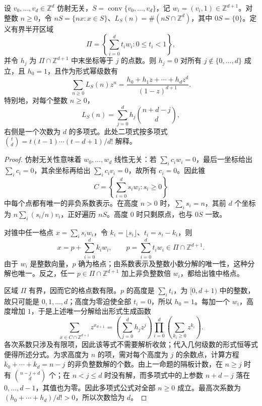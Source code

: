 \begin{proposition}
	\label{g1:prop:lattice-simplex-ehrhart}
	设 \(v_0,\ldots,v_d\in\mathbb Z^d\) 仿射无关，\(S=\operatorname{conv}\{v_0,\ldots,v_d\}\)，记 \(w_i=(v_i,1)\in\mathbb Z^{d+1}\)。对整数 \(n\ge0\)，令 \(nS=\{nx:x\in S\}\)、\(L_S(n)=\#(nS\cap\mathbb Z^d)\)，其中 \(0S=\{0\}\)。定义有界半开区域
	\[
		\Pi=\left\{\sum_{i=0}^d t_iw_i:0\le t_i<1\right\},
	\]
	并令 \(h_j\) 为 \(\Pi\cap\mathbb Z^{d+1}\) 中末坐标等于 \(j\) 的点数。则 \(h_j=0\) 对所有 \(j\notin\{0,\ldots,d\}\) 成立，且 \(h_0=1\)，且作为形式幂级数有
	\[
		\sum_{n\ge0}L_S(n)z^n
		=\frac{h_0+h_1z+\cdots+h_dz^d}{(1-z)^{d+1}}.
	\]
	特别地，对每个整数 \(n\ge0\)，
	\[
		L_S(n)=\sum_{j=0}^d h_j\binom{n+d-j}{d},
	\]
	右侧是一个次数为 \(d\) 的多项式。此处二项式按多项式 \(\binom{t}{d}=t(t-1)\cdots(t-d+1)/d!\) 解释。
\end{proposition}
\begin{proof}
	仿射无关性意味着 \(w_0,\ldots,w_d\) 线性无关：若 \(\sum_i c_iw_i=0\)，最后一坐标给出 \(\sum_i c_i=0\)，其余坐标再给出 \(\sum_i c_iv_i=0\)，故所有 \(c_i=0\)。因此锥
	\[
		C=\left\{\sum_{i=0}^d s_iw_i:s_i\ge0\right\}
	\]
	中每个点都有唯一的非负系数表示。在高度 \(n>0\) 时，\(\sum_i s_i=n\)，其前 \(d\) 个坐标为 \(n\sum_i(s_i/n)v_i\)，正好遍历 \(nS\)。高度 \(0\) 时只剩原点，也与 \(0S\) 一致。

	对锥中任一格点 \(x=\sum_i s_iw_i\)，令 \(k_i=\lfloor s_i\rfloor\)、\(t_i=s_i-k_i\)，则
	\[
		x=p+\sum_{i=0}^d k_iw_i,
		\qquad p=\sum_{i=0}^d t_iw_i\in\Pi\cap\mathbb Z^{d+1}.
	\]
	由于 \(w_i\) 是整数向量，\(p\) 确为格点；由系数表示及整数小数分解的唯一性，这种分解也唯一。反之，任一 \(p\in\Pi\cap\mathbb Z^{d+1}\) 加上非负整数倍 \(w_i\)，都给出锥中格点。

	区域 \(\Pi\) 有界，因而它的格点数有限。\(p\) 的高度是 \(\sum_i t_i\)，为 \([0,d+1)\) 中的整数，故只可能是 \(0,1,\ldots,d\)；高度为零迫使全部 \(t_i=0\)，所以 \(h_0=1\)。每加一个 \(w_i\)，高度增加 \(1\)，于是上述唯一分解给出形式生成函数
	\[
		\sum_{x\in C\cap\mathbb Z^{d+1}}z^{x_{d+1}}
		=\left(\sum_{j=0}^d h_jz^j\right)
		\prod_{i=0}^d\left(\sum_{k_i\ge0}z^{k_i}\right).
	\]
	各次系数只涉及有限项，因此该等式不需要解析收敛；代入几何级数的形式恒等式便得所述分式。为求高度为 \(n\) 的项，需对每个高度为 \(j\) 的余数点，计算方程 \(k_0+\cdots+k_d=n-j\) 的非负整数解的个数。由上一命题的隔板计数，在 \(n\ge j\) 时有 \(\binom{n-j+d}{d}\) 个；在 \(n<j\le d\) 时没有解，而多项式中的上参数 \(n+d-j\) 落在 \(0,\ldots,d-1\)，其值也为零。因此多项式公式对全部 \(n\ge0\) 成立。最高次系数为 \((h_0+\cdots+h_d)/d!>0\)，所以次数恰为 \(d\)。
\end{proof}

